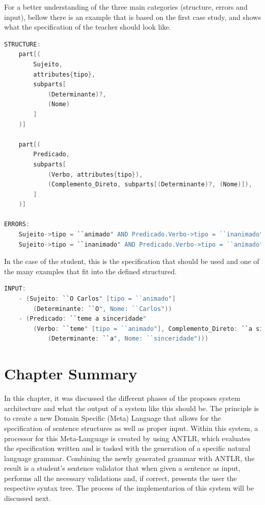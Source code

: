 For a better understanding of the three main categories (structure, errors and input), bellow there is an example that is based on the first case study, and shows what the specification of the teacher should look like.

\begin{center}
\begin{minipage}{13cm}
\begin{lstlisting}[language=java, basicstyle=\tiny, label={lst:metaStruct}, caption=Example of a possible sentence structure]
STRUCTURE:
	part[(
        Sujeito, 
        attributes{tipo}, 
        subparts[
            (Determinante)?, 
            (Nome)
        ]
	)]
    
	part[(
        Predicado,
        subparts[
            (Verbo, attributes{tipo}),
            (Complemento_Direto, subparts[(Determinante)?, (Nome)]),
        ]
	)]

ERRORS:
    Sujeito->tipo = ``animado" AND Predicado.Verbo->tipo = ``inanimado";
    Sujeito->tipo = ``inanimado" AND Predicado.Verbo->tipo = ``animado";
\end{lstlisting}
\end{minipage}
\end{center}

In the case of the student, this is the specification that should be used and one of the many examples that fit into the defined structured.

\begin{center}
\begin{minipage}{13cm}
\begin{lstlisting}[language=java, basicstyle=\tiny, label={lst:metaInput}, caption=Example of the students parsing]
INPUT:
    - (Sujeito: ``O Carlos" [tipo = ``animado"]
        (Determinante: ``O", Nome: ``Carlos"))
    - (Predicado: ``teme a sinceridade" 
        (Verbo: ``teme" [tipo = ``animado"], Complemento_Direto: ``a sinceridade" 
            (Determinante: ``a", Nome: ``sinceridade")))
\end{lstlisting}
\end{minipage}
\end{center}


\section{Chapter Summary}

In this chapter, it was discussed the different phases of the proposes system architecture and what the output of a system like this should be.
The principle is to create a new Domain Specific (Meta) Language that allows for the specification of sentence structures as well as proper input.
Within this system, a processor for this Meta-Language is created by using \textsc{ANTLR},
which evaluates the specification written and is tasked with the generation of a specific natural language grammar.
Combining the newly generated grammar with \textsc{ANTLR}, the result is a student's sentence validator
that when given a sentence as input, performs all the necessary validations and, if correct, presents the user the respective syntax tree.
The process of the implementarion of this system will be discussed next.
